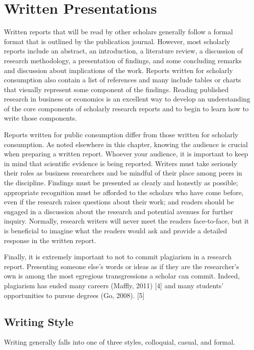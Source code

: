 \section{Written Presentations}

Written reports that will be read by other scholars generally follow a formal format that is outlined by the publication journal. However, most scholarly reports include an abstract, an introduction, a literature review, a discussion of research methodology, a presentation of findings, and some concluding remarks and discussion about implications of the work. Reports written for scholarly consumption also contain a list of references and many include tables or charts that visually represent some component of the findings. Reading published research in business or economics is an excellent way to develop an understanding of the core components of scholarly research reports and to begin to learn how to write those components.

Reports written for public consumption differ from those written for scholarly consumption. As noted elsewhere in this chapter, knowing the audience is crucial when preparing a written report. Whoever your audience, it is important to keep in mind that scientific evidence is being reported. Writers must take seriously their roles as business researchers and be mindful of their place among peers in the discipline. Findings must be presented as clearly and honestly as possible; appropriate recognition must be afforded to the scholars who have come before, even if the research raises questions about their work; and readers should be engaged in a discussion about the research and potential avenues for further inquiry. Normally, research writers will never meet the readers face-to-face, but it is beneficial to imagine what the readers would ask and provide a detailed response in the written report.

Finally, it is extremely important to not to commit plagiarism in a research report. Presenting someone else's words or ideas as if they are the researcher's own is among the most egregious transgressions a scholar can commit. Indeed, plagiarism has ended many careers (Maffly, 2011) [4] and many students' opportunities to pursue degrees (Go, 2008). [5] 

\subsection{Writing Style}

Writing generally falls into one of three styles, colloquial, casual, and formal.

